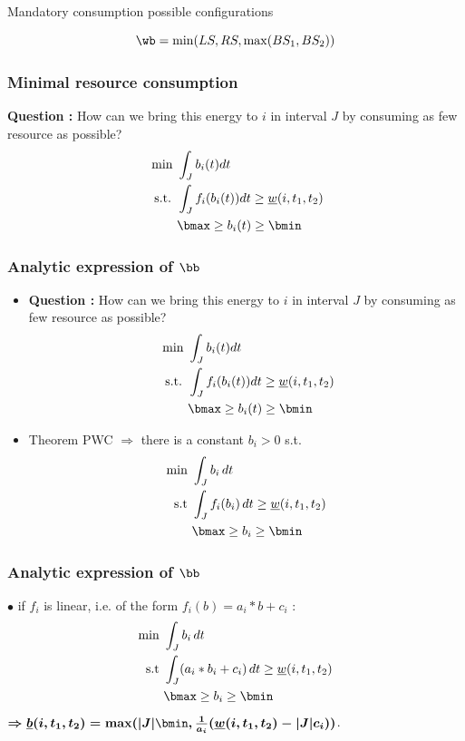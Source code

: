 \begin{frame}{Mandatory consumption possible configurations}
  
\pause
  \[\wb = \min ( LS, RS, \max (BS_1,BS_2))\]
\end{frame}

\begin{frame}
  \frametitle{Minimal resource consumption}
  \begin{center}
    
  \end{center}
  \vfill
\pause
  \textbf{Question : }
  How can we bring this energy to $i$ in interval $J$ by consuming as few resource as possible?
  \vfill
\pause
  \begin{align*}
    \text{ min }& \int_{J} b_i(t)dt  \\
    \text{ s.t. } & \int_{J}f_i(b_i(t))dt \ge  \underline{w}(i,t_1,t_2) \\
                &  \bmax \ge b_i(t) \ge \bmin
  \end{align*}
  \vfill
\end{frame}

\begin{frame}
  \frametitle{Analytic expression of $\bb$}
  \vfill
  \begin{itemize}
  \item  \textbf{Question : }
    How can we bring this energy to $i$ in interval $J$ by consuming as few resource as possible?
    \vfill
    \begin{align*}
      \text{ min }& \int_{J} b_i(t)dt  \\
      \text{ s.t. } & \int_{J}f_i(b_i(t))dt \ge  \underline{w}(i,t_1,t_2) \\
                  &  \bmax \ge b_i(t) \ge \bmin
    \end{align*}
    \vfill
\pause
  \item Theorem PWC $\Rightarrow$ there is a constant $b_{i} > 0 $
    s.t. 
\pause
    \begin{align*}
      \text{min }  & \int_{J} b_i\,dt  \\
      \text{s.t } & \int_{J}f_i(b_i)\,dt \ge
                    \underline{w}(i,t_1,t_2)\\
                   & \bmax \ge b_i \ge \bmin
    \end{align*}
  \end{itemize}
  \vfill
\end{frame}

\begin{frame}
  \frametitle{Analytic expression of $\bb$}
  \vfill
  $\bullet$ if $f_i$ is linear, i.e. of the form $f_i(b)= a_i*b+c_i$ :
\pause
    \begin{align*}
      \text{min }  & \int_{J} b_i\,dt  \\
      \text{s.t } & \int_{J}(a_i*b_i+c_i)\,dt \ge
                    \underline{w}(i,t_1,t_2)\\
                   & \bmax \ge b_i \ge \bmin
    \end{align*}
\pause
  { \color{blue!80!black!80}
    $\boldmath{\Rightarrow  \underline{b}(i,t_1,t_2)= \max ( |J|\bmin, \frac{1}{a_i}( \underline{w}(i,t_1,t_2)-|J|c_i))}$}.
 
\end{frame}


